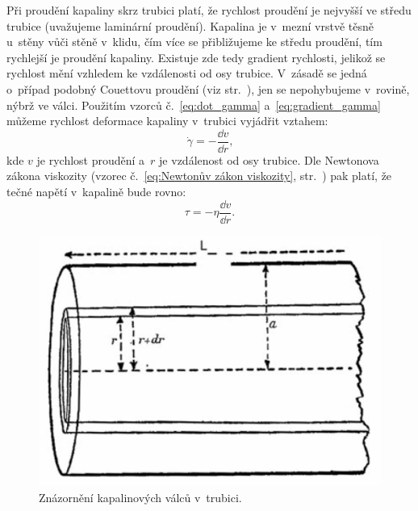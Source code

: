 \documentclass[12pt]{article}
\begin{document}
Při proudění kapaliny skrz trubici platí, že rychlost proudění je nejvyšší ve středu trubice (uvažujeme laminární proudění). Kapalina je v~mezní vrstvě těsně u~stěny vůči stěně v~klidu, čím více se přibližujeme ke středu proudění, tím rychlejší je proudění kapaliny. Existuje zde tedy gradient rychlosti, jelikož se rychlost mění vzhledem ke vzdálenosti od osy trubice. V~zásadě se jedná o~případ podobný Couettovu proudění (viz str.~\pageref{sec:Couettovo_proudění}), jen se nepohybujeme v~rovině, nýbrž ve válci. Použitím vzorců č.~\ref{eq:dot_gamma} a~\ref{eq:gradient_gamma} můžeme rychlost deformace kapaliny v~trubici vyjádřit vztahem:~\cite{book:Calibration_of_viscometers}
\begin{equation}
    \dot\gamma = -\frac{\dd v}{\dd r}\text{,}
    \label{eq:gamma_gradient}
\end{equation}
kde $v$ je rychlost proudění a~$r$ je vzdálenost od osy trubice. Dle Newtonova zákona viskozity (vzorec č.~\ref{eq:Newtonův zákon viskozity}, str.~\pageref{eq:Newtonův zákon viskozity}) pak platí, že tečné napětí v~kapalině bude rovno:~\cite{book:Calibration_of_viscometers}
\begin{equation}
    \tau = -\eta\frac{\dd v}{\dd r}\text{.}
\end{equation}

\begin{figure}
    \centering
    \includegraphics[width=0.5\linewidth]{figures/valce_kapaliny.png}
    \caption{Znázornění kapalinových válců v~trubici.~\cite{book:Calibration_of_viscometers}}
    \label{fig:valce}
\end{figure}
\end{document}
